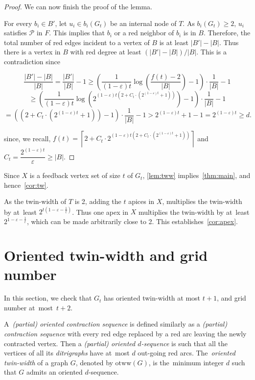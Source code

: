 \documentclass[a4paper,UKenglish,cleveref,hyperref,autoref]{lipics-v2021}
\renewcommand{\geq}{\geqslant}
\newcommand{\otww}{\text{otww}}
\newcommand\abs[1]{\lvert #1\rvert}
\begin{document}
\begin{proof}
We can now finish the proof of the lemma.

  For every $b_i \in B'$, let $u_i \in b_i(G_t)$ be an internal node of $T$.
  As $b_i(G_t) \geq 2$, $u_i$ satisfies $\mathscr P$ in $F$.
  This implies that $b_i$ or a red neighbor of $b_i$ is in $B$.
  Therefore, the total number of red edges incident to a vertex of $B$ is at least $|B'|-|B|$.
  Thus there is a vertex in $B$ with red degree at least $(|B'|-|B|)/|B|$.
  This is a contradiction since

    $$\frac{|B'|-|B|}{|B|} = \frac{|B'|}{|B|}-1 \geq \left(\frac{1}{(1-\varepsilon) t} \log\left(\frac{f(t)-2}{\abs{B}}\right)-1\right) \cdot \frac{1}{|B|}-1 $$
  $$ \geq \left(\frac{1}{(1-\varepsilon) t} \log\left(2^{(1-\varepsilon) t(2+C_t \cdot (2^{(1-\varepsilon) t}+1))}\right)-1\right) \cdot \frac{1}{|B|}-1 $$
  $$ = \left((2+C_t \cdot (2^{(1-\varepsilon) t}+1)) -1\right) \cdot \frac{1}{|B|}-1 > 2^{(1-\varepsilon) t}+1 - 1 = 2^{(1-\varepsilon) t} \geq d.$$
    
    since, we recall, $f(t)=\left\lceil2+C_t \cdot 2^{(1-\varepsilon) t(2+C_t \cdot (2^{(1-\varepsilon) t}+1))}\right\rceil$ and $C_t = \dfrac{2^{(1-\varepsilon) t}}{\varepsilon} \geq |B|$.
\end{proof}

Since $X$ is a feedback vertex set of size $t$ of $G_t$, \cref{lem:tww} implies~\cref{thm:main}, and hence~\cref{cor:tw}.

As the twin-width of $T$ is 2, adding the $t$ apices in $X$, multiplies the twin-width by at~least $2^{t(1-\varepsilon-\frac{1}{t})}$.
Thus one apex in $X$ multiplies the twin-width by at~least $2^{1-\varepsilon-\frac{1}{t}}$, which can be made arbitrarily close to 2.
This establishes~\cref{cor:apex}.

\section{Oriented twin-width and grid number}

In this section, we check that $G_t$ has oriented twin-width at most $t+1$, and grid number at~most~$t+2$.

A~\emph{(partial) oriented contraction sequence} is defined similarly as a \emph{(partial) contraction sequence} with every red edge replaced by a red arc leaving the newly contracted vertex.
Then a \emph{(partial) oriented $d$-sequence} is such that all the vertices of all its \emph{ditrigraphs} have at~most $d$ out-going red arcs.
The~\emph{oriented twin-width} of a graph $G$, denoted by $\otww(G)$, is the~minimum integer $d$ such that $G$ admits an oriented $d$-sequence.
\end{document}
